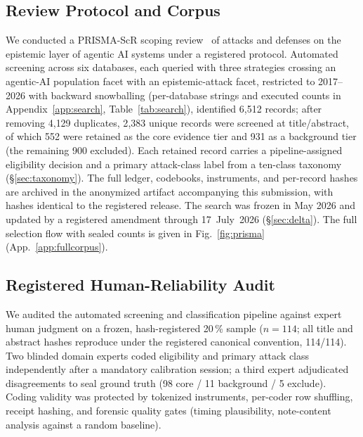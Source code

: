 \documentclass[conference]{IEEEtran}
\begin{document}
\subsection{Review Protocol and Corpus}
We conducted a PRISMA-ScR scoping review~\cite{prisma} of attacks
and defenses on the epistemic layer of agentic AI systems under a
registered protocol. Automated screening across six databases,
each queried with three strategies crossing an agentic-AI
population facet with an epistemic-attack facet, restricted to
2017--2026 with backward snowballing (per-database strings and
executed counts in Appendix~\ref{app:search}, Table~\ref{tab:search}),
identified 6{,}512 records; after removing 4{,}129 duplicates,
2{,}383 unique records were screened at title/abstract, of which
552 were retained as the core evidence tier and 931 as a
background tier (the remaining 900 excluded). Each retained record
carries a pipeline-assigned eligibility decision and a primary
attack-class label from a ten-class taxonomy
(\S\ref{sec:taxonomy}). The full ledger, codebooks, instruments,
and per-record hashes are archived in the anonymized artifact
accompanying this submission, with hashes identical to the
registered release. The search was frozen in May 2026 and updated
by a registered amendment through 17~July~2026
(\S\ref{sec:delta}). The full selection flow with sealed counts is given in Fig.~\ref{fig:prisma} (App.~\ref{app:fullcorpus}).



\subsection{Registered Human-Reliability Audit}
\label{sec:audit}
We audited the automated screening and classification pipeline
against expert human judgment on a frozen, hash-registered 20\,\%
sample ($n = 114$; all title and abstract hashes reproduce under
the registered canonical convention, 114/114). Two blinded domain experts coded eligibility and primary
attack class independently after a mandatory calibration session;
a third expert adjudicated disagreements to seal ground truth (98
core / 11 background / 5 exclude). Coding validity was protected
by tokenized instruments, per-coder row shuffling, receipt
hashing, and forensic quality gates (timing plausibility,
note-content analysis against a random baseline).
\end{document}
